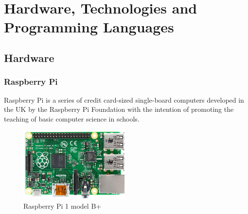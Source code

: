 \chapter{Hardware, Technologies and Programming Languages}


\section{Hardware}

\subsection{Raspberry Pi} 
Raspberry Pi is a series of credit card-sized single-board computers developed in the UK by the Raspberry Pi Foundation with the intention of promoting the teaching of basic computer science in schools.

\begin{figure}
  \begin{center}
    \includegraphics[width=0.5\textwidth]{./images/raspberry_pi_b.jpg}
  \end{center}
  \caption{Raspberry Pi 1 model B+}
\end{figure}

